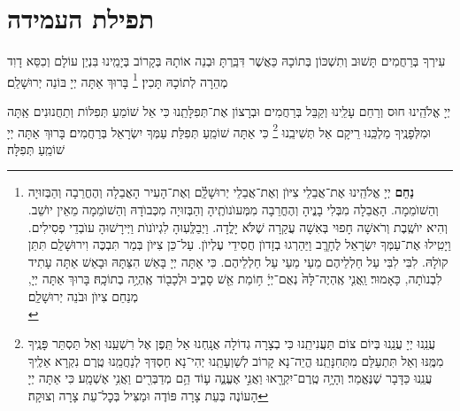 \documentclass[twoside, openany, parskip=half, 11pt]{book}
\begin{document}
\section[תפילת העמידה]{ תפילת העמידה }


\amidaopening{\ayt}{}

\weekdaysakedusha \vspace{0.5\baselineskip}

\sepline

\weekdaysabinah

\weekdaysateshuva

\weekdaysaselichah

\weekdaysageulah

\weekdaysaanneinu

\weekdaysarefuah

\weekdaysaberacha

\weekdaysashofar

\weekdaysamishpat

\weekdaysaminim

\weekdaysatzadikim

עִירְךָ בְּרַחֲמִים תָּשׁוּב וְתִשְׁכּוֹן בְּתוֹכָהּ כַּאֲשֶׁר דִּבַּֽרְתָּ וּבְנֵה אוֹתָהּ בְּקָרוֹב בְּיָמֵֽינוּ בִּנְיַן עוֹלָם וְכִסֵּא דָוִד מְהֵרָה לְתוֹכָהּ תָּכִין׃
\footnote{
\textbf{נַחֵם}
יְיָ אֱלֹהֵֽינוּ אֶת־אֲבֵלֵי צִיּוֺן וְאֶת־אֲבֵלֵי יְרוּשָׁלַֽ֔֗͏ִם וְאֶת־הָעִיר הָאֲבֵלָה וְהֶחֳרֵבָה וְהַבְּזוּיָה וְהַשׁוֺמֵמָה. הָאֲבֵלָה מִבְּלִי בָנֱיהָ וְהֶחֳרֵבָה מִמְּעוֺנוֺתֶֽיהָ וְהַבְּזוּיָה מִכְּבוֺדָהּ וְהַשׁוֺמֵמָה מֵאֵין יוֺשֵׁב. וְהִיא יוֺשֶֽׁבֶת וְרֹאשָׁה חָפוּי בְּאִשָׁה עֲקַרָה שֶׁלֹּא יָלֳדָה. וַיְבַלְְּעֽוּהָ לִגְיוֺנוֺת וַיְּירָשׁוּהָ עוֺבְדֵי פְסִילִים. וַיָטִֽילוּ אֶת־עַמְּךָ יִשְׂרָאֵל לֶחָרֱֽב וַיַּהַרְגוּ בְזָדוֺן חֲסִידֵי עֶלְיוֺן. עַל־כֵּן צִיּוֺן בְּמַר תִּבְכֶּה וִירוּשָׁלַֽ͏ִם תִּתֵּן קוֺלָהּ. לִבִּי לִבִּי עַל חַלְלֵיהֶם מֵעַי מֵעַי עַל חַלְלֵיהֶם. כִּי אַתָּה יְיָ בָּאֵשׁ הִצַּתָּהּ וּבָאֵשׁ אַתָּה עָתִיד לִבְנוֺתָה, כָּאָמוּר׃
%
וַֽאֲנִ֤י אֶֽהְיֶה־לָּהּ֙ נְאֻם־יְיָ֔ ח֥וֹמַת אֵ֖שׁ סָבִ֑יב וּלְכָב֖וֹד אֶֽהְיֶ֥ה בְתוֹכָֽהּ׃
בָּרוּךְ אַתָּה יְיָ, מְנַחֵם צִיוֺן וּבֹנֵה יְרוּשָׁלַֽ͏ִם׃ \\
}
בָּרוּךְ אַתָּה יְיָ בּוֹנֵה יְרוּשָׁלַ‍ִם׃

\weekdaysamalchus

יְיָ אֱלֹהֵֽינוּ חוּס וְרַחֵם עָלֵֽינוּ וְקַבֵּל בְּרַחֲמִים וּבְרָצוֹן אֶת־תְּפִלָּתֵֽנוּ כִּי אֵל שׁוֹמֵעַ תְּפִלּוֹת וְתַחֲנוּנִים אַֽתָּה וּמִלְּפָנֶֽיךָ מַלְכֵּֽנוּ רֵיקָם אַל תְּשִׁיבֵֽנוּ
\footnote{
עֲנֵֽנוּ יְיָ עֲנֵֽנוּ בְּיוֹם צוֹם תַּעֲנִיתֵֽנוּ כִּי בְצָרָה גְדוֹלָה אֲנָֽחְנוּ אַל תֵּֽפֶן אֶל רִשְׁעֵֽנוּ וְאַל תַּסְתֵּר פָּנֶֽיךָ מִמֶּֽנּוּ וְאַל תִּתְעַלַּם מִתְּחִנָּתֵֽנוּ׃ הֱיֵה־נָא קָרוֹב לְשַׁוְעָתֵֽנוּ יְהִי־נָא חַסְדְּךָ לְנַחֲמֵֽנוּ טֶֽרֶם נִקְרָא אֵלֶֽיךָ עֲנֵֽנוּ כַּדָּבָר שֶׁנֶּאֱמַר׃
%
וְהָיָ֥ה טֶֽרֶם־יִקְרָ֖אוּ וַאֲנִ֣י אֶעֱנֶ֑ה ע֛וֹד הֵ֥ם מְדַבְּרִ֖ים וַאֲנִ֥י אֶשְׁמָֽע׃ כִּי אַתָּה יְיָ הָעוֹנֶה בְּעֵת צָרָה פּוֹדֶה וּמַצִּיל בְּכׇל־עֵת צָרָה וְצוּקָה׃
}
כִּי אַתָּה שׁוֹמֵֽעַ תְּפִלַּת עַמְּךָ יִשְׂרָאֵל בְּרַחֲמִים׃ בָּרוּךְ אַתָּה יְיָ שׁוֹמֵֽעַ תְּפִלָּה׃
\end{document}
